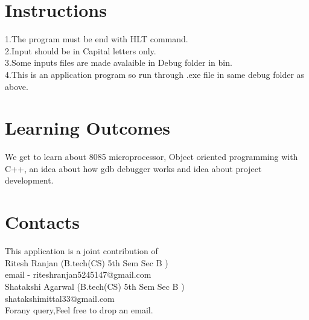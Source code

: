 \documentclass[12pt]{article}
\begin{document}
	\section{Instructions} 
	1.The program must be end with HLT command.\\
	2.Input should be in Capital letters only.\\
	3.Some inputs files are made avalaible in Debug folder in bin.\\
	4.This is an application program so run through .exe file in same debug folder as above.\\
	\section{Learning Outcomes}
	We get to learn about 8085 microprocessor, Object oriented programming with C++, an idea about how gdb debugger works and idea about project development.\\
	\section{Contacts}
	 This application is a joint contribution of\\
	 Ritesh Ranjan (B.tech(CS) 5th Sem Sec B )\\
	 email - riteshranjan5245147@gmail.com\\
	 Shatakshi Agarwal (B.tech(CS) 5th Sem Sec B )\\
	 shatakshimittal33@gmail.com\\
	 Forany query,Feel free to drop an email. \\
 
\end{document}
